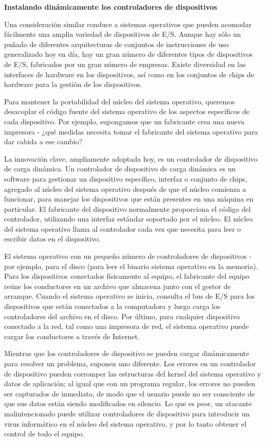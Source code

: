 \documentclass[10pt]{book}
\begin{document}
\setlength{\parindent}{20pt} \textbf{Instalando dinámicamente los controladores de dispositivos} \setlength{\parindent}{0pt}

Una consideración similar conduce a sistemas operativos que pueden acomodar fácilmente una amplia variedad de dispositivos de E/S. Aunque hay sólo un puñado de diferentes arquitecturas de conjuntos de instrucciones de uso generalizado hoy en día, hay un gran número de diferentes tipos de dispositivos de E/S, fabricados por un gran número de empresas. Existe diversidad en las interfaces de hardware en los dispositivos, así como en los conjuntos de chips de hardware para la gestión de los dispositivos.

Para mantener la portabilidad del núcleo del sistema operativo, queremos desacoplar el código fuente del sistema operativo de los aspectos específicos de cada dispositivo. Por ejemplo, supongamos que un fabricante crea una nueva impresora - ¿qué medidas necesita tomar el fabricante del sistema operativo para dar cabida a ese cambio?

La innovación clave, ampliamente adoptada hoy, es un controlador de dispositivo de carga dinámica. Un controlador de dispositivo de carga dinámica es un software para gestionar un dispositivo específico, interfaz o conjunto de chips, agregado al núcleo del sistema operativo después de que el núcleo comienza a funcionar, para manejar los dispositivos que están presentes en una máquina en particular. El fabricante del dispositivo normalmente proporciona el código del controlador, utilizando una interfaz estándar soportado por el núcleo. El núcleo del sistema operativo llama al controlador cada vez que necesita para leer o escribir datos en el dispositivo.

El sistema operativo con un pequeño número de controladores de dispositivos - por ejemplo, para el disco (para leer el binario sistema operativo en la memoria). Para los dispositivos conectados físicamente al equipo, el fabricante del equipo reúne los conductores en un archivo que almacena junto con el gestor de arranque. Cuando el sistema operativo se inicia, consulta el bus de E/S para los dispositivos que están conectados a la computadora y luego carga los controladores del archivo en el disco. Por último, para cualquier dispositivo conectado a la red, tal como una impresora de red, el sistema operativo puede cargar los conductores a través de Internet.

Mientras que los controladores de dispositivo se pueden cargar dinámicamente para resolver un problema, suponen uno diferente. Los errores en un controlador de dispositivo pueden corromper las estructuras del kernel del sistema operativo y datos de aplicación; al igual que con un programa regular, los errores no pueden ser capturados de inmediato, de modo que el usuario puede no ser consciente de que sus datos están siendo modificados en silencio. Lo que es peor, un atacante malintencionado puede utilizar controladores de dispositivo para introducir un virus informático en el núcleo del sistema operativo, y por lo tanto obtener el control de todo el equipo.
\end{document}
